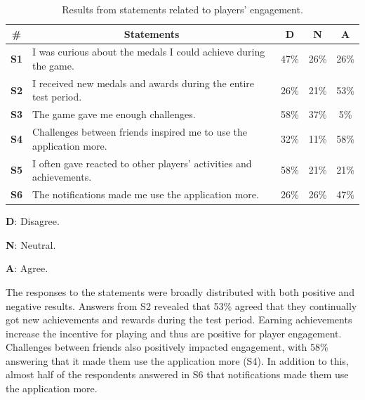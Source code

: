 \begin{table}[H]
    \begin{threeparttable}[t]
    \small
    \begin{tabularx}{\textwidth}{|c|X|c|c|c|}
        \hline
        \multicolumn{1}{|c|}{\textbf{\#}} &
        \multicolumn{1}{c|}{\textbf{Statements}}  & 
        \multicolumn{1}{c|}{\textbf{D}} & 
        \multicolumn{1}{c|}{\textbf{N}}  & 
        \multicolumn{1}{c|}{\textbf{A}} \\ \hline
        \textbf{S1} & I was curious about the medals I could achieve during the game. & 47\% & 26\% & 26\%  \\
        \textbf{S2} & I received new medals and awards during the entire test period. & 26\% & 21\% & 53\%  \\
        \textbf{S3} & The game gave me enough challenges. & 58\% & 37\% & 5\% \\
        \textbf{S4} & Challenges between friends inspired me to use the application more. & 32\% & 11\% & 58\%  \\
        \textbf{S5} & I often gave reacted to other players' activities and achievements. & 58\% & 21\% & 21\%  \\
        \textbf{S6} & The notifications made me use the application more. & 26\% & 26\% & 47\%  \\
        \hline
        \end{tabularx}
    \begin{tablenotes}
    \scriptsize
     \item[] \textbf{D}: Disagree.
     \item[] \textbf{N}: Neutral.
     \item[] \textbf{A}: Agree.
  \end{tablenotes}
  \end{threeparttable}
    \caption{Results from statements related to players’ engagement.}
    \label{tab:statements_engagemet_answers}
    \vspace*{-\baselineskip}
\end{table}

The responses to the statements were broadly distributed with both positive and negative results. Answers from S2 revealed that 53\% agreed that they continually got new achievements and rewards during the test period. Earning achievements increase the incentive for playing and thus are positive for player engagement. Challenges between friends also positively impacted engagement, with 58\% answering that it made them use the application more (S4). In addition to this, almost half of the respondents answered in S6 that notifications made them use the application more. 

